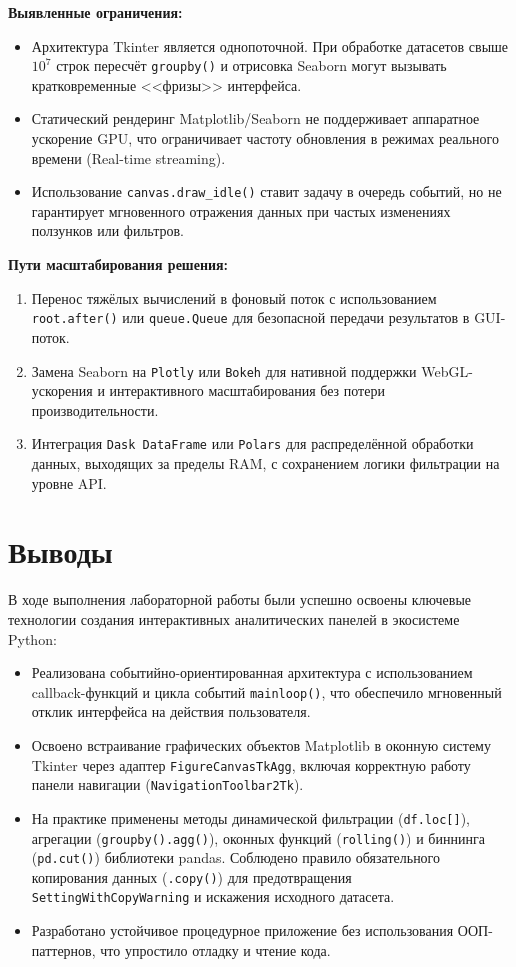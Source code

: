 \documentclass[oneside,a4paper,14pt]{extarticle} %
\begin{document}
\textbf{Выявленные ограничения:}
\begin{itemize}
    \item Архитектура Tkinter является однопоточной. При обработке датасетов свыше $10^7$ строк пересчёт \texttt{groupby()} и отрисовка Seaborn могут вызывать кратковременные <<фризы>> интерфейса.
    \item Статический рендеринг Matplotlib/Seaborn не поддерживает аппаратное ускорение GPU, что ограничивает частоту обновления в режимах реального времени (Real-time streaming).
    \item Использование \texttt{canvas.draw\_idle()} ставит задачу в очередь событий, но не гарантирует мгновенного отражения данных при частых изменениях ползунков или фильтров.
\end{itemize}

\textbf{Пути масштабирования решения:}
\begin{enumerate}
    \item Перенос тяжёлых вычислений в фоновый поток с использованием \texttt{root.after()} или \texttt{queue.Queue} для безопасной передачи результатов в GUI-поток.
    \item Замена Seaborn на \texttt{Plotly} или \texttt{Bokeh} для нативной поддержки WebGL-ускорения и интерактивного масштабирования без потери производительности.
    \item Интеграция \texttt{Dask DataFrame} или \texttt{Polars} для распределённой обработки данных, выходящих за пределы RAM, с сохранением логики фильтрации на уровне API.
\end{enumerate}

\section{Выводы}
В ходе выполнения лабораторной работы были успешно освоены ключевые технологии создания интерактивных аналитических панелей в экосистеме Python:
\begin{itemize}
    \item Реализована событийно-ориентированная архитектура с использованием callback-функций и цикла событий \texttt{mainloop()}, что обеспечило мгновенный отклик интерфейса на действия пользователя.
    \item Освоено встраивание графических объектов Matplotlib в оконную систему Tkinter через адаптер \texttt{FigureCanvasTkAgg}, включая корректную работу панели навигации (\texttt{NavigationToolbar2Tk}).
    \item На практике применены методы динамической фильтрации (\texttt{df.loc[]}), агрегации (\texttt{groupby().agg()}), оконных функций (\texttt{rolling()}) и биннинга (\texttt{pd.cut()}) библиотеки pandas. Соблюдено правило обязательного копирования данных (\texttt{.copy()}) для предотвращения \texttt{SettingWithCopyWarning} и искажения исходного датасета.
    \item Разработано устойчивое процедурное приложение без использования ООП-паттернов, что упростило отладку и чтение кода.
\end{itemize}
\end{document}

